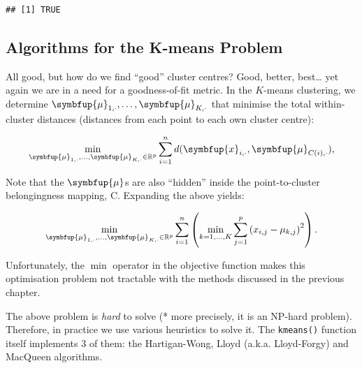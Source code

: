 \documentclass[10pt,b5paper,krantz1]{krantz}
\renewcommand{\mathbf}[1]{\symbfup{#1}}
\renewcommand{\boldsymbol}[1]{\symbfup{#1}}
\begin{document}
\begin{verbatim}
## [1] TRUE
\end{verbatim}

\hypertarget{algorithms-for-the-k-means-problem}{%
\subsection{Algorithms for the K-means Problem}\label{algorithms-for-the-k-means-problem}}

All good, but how do we find ``good'' cluster centres?
Good, better, best\ldots{} yet again we are in a need for a goodness-of-fit metric.
In the \(K\)-means clustering, we determine
\(\boldsymbol\mu_{1,\cdot}, \dots, \boldsymbol\mu_{K,\cdot}\)
that minimise the total within-cluster distances (distances from each point
to each own cluster centre):

\[
\min_{\boldsymbol\mu_{1,\cdot}, \dots, \boldsymbol\mu_{K,\cdot} \in \mathbb{R}^p}
\sum_{i=1}^n
d(\mathbf{x}_{i,\cdot}, \boldsymbol\mu_{C(i),\cdot}),
\]

Note that the \(\boldsymbol\mu\)s are also ``hidden'' inside the point-to-cluster
belongingness mapping, \(\mathrm{C}\).
Expanding the above yields:

\[
\min_{\boldsymbol\mu_{1,\cdot}, \dots, \boldsymbol\mu_{K,\cdot} \in \mathbb{R}^p}
\sum_{i=1}^n \left(
\min_{k=1,\dots,K}
\sum_{j=1}^p \left(x_{i,j}-\mu_{k,j}\right)^2
\right).
\]

Unfortunately, the \(\min\) operator in the objective function
makes this optimisation problem not tractable
with the methods discussed in the previous chapter.

The above problem is \emph{hard} to solve (* more precisely,
it is an NP-hard problem).
Therefore, in practice we use various heuristics to solve it.
The \texttt{kmeans()} function itself implements 3 of them:
the Hartigan-Wong, Lloyd (a.k.a. Lloyd-Forgy) and MacQueen algorithms.
\end{document}
